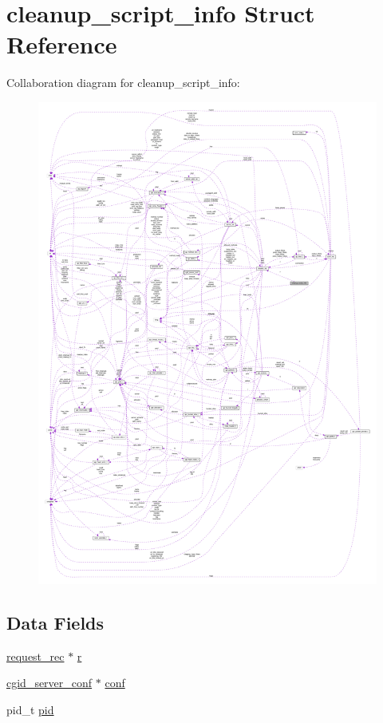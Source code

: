 \hypertarget{structcleanup__script__info}{}\section{cleanup\+\_\+script\+\_\+info Struct Reference}
\label{structcleanup__script__info}


Collaboration diagram for cleanup\+\_\+script\+\_\+info\+:
\nopagebreak
\begin{figure}[H]
\begin{center}
\leavevmode
\includegraphics[width=350pt]{structcleanup__script__info__coll__graph}
\end{center}
\end{figure}
\subsection*{Data Fields}
\begin{DoxyCompactItemize}
\item 
\hyperlink{structrequest__rec}{request\+\_\+rec} $\ast$ \hyperlink{structcleanup__script__info_a22b7a94bd0fc7d62f135642fd045c8eb}{r}
\item 
\hyperlink{structcgid__server__conf}{cgid\+\_\+server\+\_\+conf} $\ast$ \hyperlink{structcleanup__script__info_a932cba36eca403e4547e8b92faef2c88}{conf}
\item 
pid\+\_\+t \hyperlink{structcleanup__script__info_aa5ea8772148c3cbc04537ec13893c7e8}{pid}
\end{DoxyCompactItemize}


